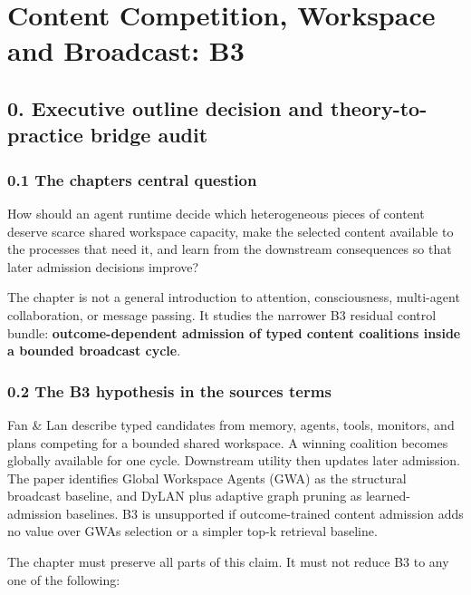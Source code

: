 \chapter{Content Competition, Workspace and Broadcast: B3}\label{content-competition-workspace-and-broadcast-b3}

\section{0. Executive outline decision and theory-to-practice bridge audit}\label{0-executive-outline-decision-and-theory-to-practice-bridge-audit}

\subsection{0.1 The chapter\textquotesingle s central question}\label{01-the-chapters-central-question}

How should an agent runtime decide which heterogeneous pieces of content deserve scarce shared workspace capacity, make the selected content available to the processes that need it, and learn from the downstream consequences so that later admission decisions improve?

The chapter is not a general introduction to attention, consciousness, multi-agent collaboration, or message passing. It studies the narrower B3 residual control bundle: \textbf{outcome-dependent admission of typed content coalitions inside a bounded broadcast cycle}.

\subsection{0.2 The B3 hypothesis in the source\textquotesingle s terms}\label{02-the-b3-hypothesis-in-the-sources-terms}

Fan \& Lan describe typed candidates from memory, agents, tools, monitors, and plans competing for a bounded shared workspace. A winning coalition becomes globally available for one cycle. Downstream utility then updates later admission. The paper identifies Global Workspace Agents (GWA) as the structural broadcast baseline, and DyLAN plus adaptive graph pruning as learned-admission baselines. B3 is unsupported if outcome-trained content admission adds no value over GWA\textquotesingle s selection or a simpler top-k retrieval baseline.

The chapter must preserve all parts of this claim. It must not reduce B3 to any one of the following:

